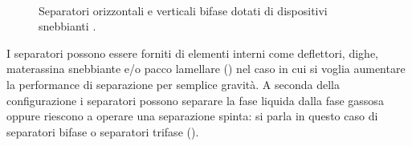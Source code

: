 \begin{figure}[htbp]
    \centering
     \qquad
     \\
\caption{Separatori orizzontali e verticali bifase dotati di dispositivi snebbianti \parencite{peerless2009vane}.}
\label{fig:bifase}
\end{figure}
I separatori possono essere forniti di elementi interni come deflettori, dighe, materassina snebbiante e/o pacco lamellare () nel caso in cui si voglia aumentare la performance di separazione per semplice gravità. A seconda della configurazione i separatori possono separare la fase liquida dalla fase gassosa oppure riescono a operare una separazione spinta: si parla in questo caso di separatori bifase o separatori trifase ().
